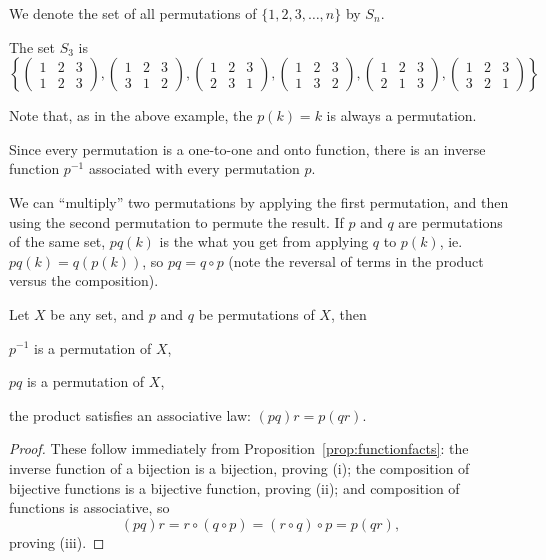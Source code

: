 We denote the set of all permutations of $\{1,2,3,\ldots,n\}$ by $S_{n}$.

\begin{example}\label{eg:perm3part1}
  The set $S_{3}$ is
  \[
    \left\{\begin{pmatrix}
      1 & 2 & 3 \\
      1 & 2 & 3
    \end{pmatrix},
    \begin{pmatrix}
      1 & 2 & 3 \\
      3 & 1 & 2
    \end{pmatrix},
    \begin{pmatrix}
      1 & 2 & 3 \\
      2 & 3 & 1
    \end{pmatrix},
    \begin{pmatrix}
      1 & 2 & 3 \\
      1 & 3 & 2
    \end{pmatrix},
    \begin{pmatrix}
      1 & 2 & 3 \\
      2 & 1 & 3
    \end{pmatrix},
    \begin{pmatrix}
      1 & 2 & 3 \\
      3 & 2 & 1
    \end{pmatrix} \right\}
  \]
\end{example}

Note that, as in the above example, the  $p(k) = k$ is always a permutation.

Since every permutation is a one-to-one and onto function, there is an inverse
function $p^{-1}$ associated with every permutation $p$.

We can ``multiply'' two permutations by applying the first permutation, and
then using the second permutation to permute the result.  If $p$ and $q$ are
permutations of the same set, $pq(k)$ is the what you get from applying $q$
to $p(k)$, ie.\ $pq(k) = q(p(k))$, so $pq = q \circ p$ (note the reversal of
terms in the product versus the composition).

\begin{proposition}\label{prop:permgroup}
  Let $X$ be any set, and $p$ and $q$ be permutations of $X$, then
  \begin{theoremenum}
    \item $p^{-1}$ is a permutation of $X$,
    \item $pq$ is a permutation of $X$,
    \item the product satisfies an associative law: $(pq)r = p(qr)$.
  \end{theoremenum}
\end{proposition}
\begin{proof}
  These follow immediately from Proposition~\ref{prop:functionfacts}:
  the inverse
  function of a bijection is a bijection, proving (i); the composition
  of bijective functions is a bijective function, proving (ii); and
  composition of functions is associative, so 
  \[
    (pq)r = r \circ (q \circ p) = (r \circ q) \circ p = p(qr),
  \]
  proving (iii).
\end{proof}

